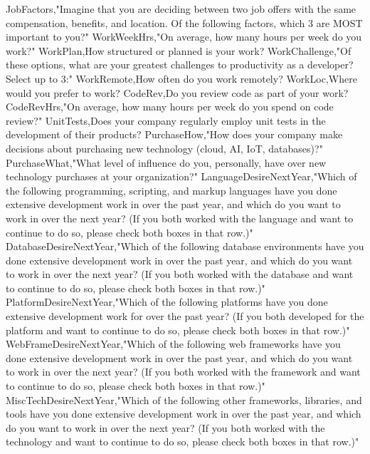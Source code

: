 \begin{appendices}
    JobFactors,"Imagine that you are deciding between two job offers with the same compensation, benefits, and location. Of the following factors, which 3 are MOST important to you?"
    WorkWeekHrs,"On average, how many hours per week do you work?"
    WorkPlan,How structured or planned is your work?
    WorkChallenge,"Of these options, what are your greatest challenges to productivity as a developer? Select up to 3:"
    WorkRemote,How often do you work remotely?
    WorkLoc,Where would you prefer to work?
    CodeRev,Do you review code as part of your work?
    CodeRevHrs,"On average, how many hours per week do you spend on code review?"
    UnitTests,Does your company regularly employ unit tests in the development of their products?
    PurchaseHow,"How does your company make decisions about purchasing new technology (cloud, AI, IoT, databases)?"
    PurchaseWhat,"What level of influence do you, personally, have over new technology purchases at your organization?"
    LanguageDesireNextYear,"Which of the following programming, scripting, and markup languages have you done extensive development work in over the past year, and which do you want to work in over the next year?  (If you both worked with the language and want to continue to do so, please check both boxes in that row.)"
    DatabaseDesireNextYear,"Which of the following database environments have you done extensive development work in over the past year, and which do you want to work in over the next year?   (If you both worked with the database and want to continue to do so, please check both boxes in that row.)"
    PlatformDesireNextYear,"Which of the following platforms have you done extensive development work for over the past year?   (If you both developed for the platform and want to continue to do so, please check both boxes in that row.)"
    WebFrameDesireNextYear,"Which of the following web frameworks have you done extensive development work in over the past year, and which do you want to work in over the next year? (If you both worked with the framework and want to continue to do so, please check both boxes in that row.)"
    MiscTechDesireNextYear,"Which of the following other frameworks, libraries, and tools have you done extensive development work in over the past year, and which do you want to work in over the next year? (If you both worked with the technology and want to continue to do so, please check both boxes in that row.)"



\end{appendices}
